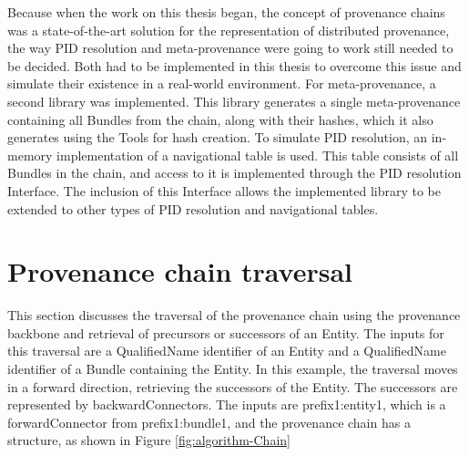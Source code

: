 \documentclass[
  digital,     %
  oneside,     %
  nosansbold,  %
  nocolorbold, %
  lof,         %
  lot,         %
]{fithesis4}
\begin{document}
Because when the work on this thesis began, the concept of provenance chains was a state-of-the-art solution for the representation of distributed provenance, the way PID resolution and meta-provenance were going to work still needed to be decided. Both had to be implemented in this thesis to overcome this issue and simulate their existence in a real-world environment. For meta-provenance, a second library was implemented. This library generates a single meta-provenance containing all Bundles from the chain, along with their hashes, which it also generates using the Tools for hash creation. To simulate PID resolution, an in-memory implementation of a navigational table is used. This table consists of all Bundles in the chain, and access to it is implemented through the PID resolution Interface. The inclusion of this Interface allows the implemented library to be extended to other types of PID resolution and navigational tables.
\shorthandon{-}

\section{Provenance chain traversal}
\shorthandoff{-}
This section discusses the traversal of the provenance chain using the provenance backbone and retrieval of precursors or successors of an Entity. The inputs for this traversal are a QualifiedName identifier of an Entity and a QualifiedName identifier of a Bundle containing the Entity. In this example, the traversal moves in a forward direction, retrieving the successors of the Entity. The successors are represented by backwardConnectors. The inputs are prefix1:entity1, which is a forwardConnector from prefix1:bundle1, and the provenance chain has a structure, as shown in Figure \ref{fig:algorithm-Chain}
\end{document}
